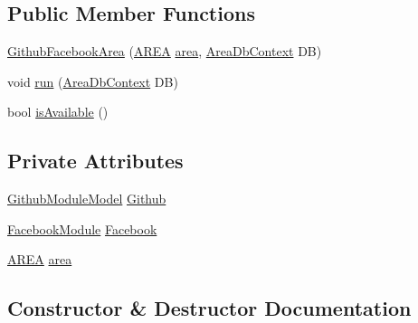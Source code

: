 \subsection*{Public Member Functions}
\begin{DoxyCompactItemize}
\item 
\mbox{\hyperlink{classArea_1_1Models_1_1GithubFacebookArea_a233779b2e51c30dbbfc24051c8bad602}{Github\+Facebook\+Area}} (\mbox{\hyperlink{classArea_1_1Models_1_1AREA}{A\+R\+EA}} \mbox{\hyperlink{classArea_1_1Models_1_1GithubFacebookArea_a4ab3d7c1e18136e3d9b22b640cb3e052}{area}}, \mbox{\hyperlink{classArea_1_1DAT_1_1AreaDbContext}{Area\+Db\+Context}} DB)
\item 
void \mbox{\hyperlink{classArea_1_1Models_1_1GithubFacebookArea_a984d46335dd21d81088312ebe413a0fc}{run}} (\mbox{\hyperlink{classArea_1_1DAT_1_1AreaDbContext}{Area\+Db\+Context}} DB)
\item 
bool \mbox{\hyperlink{classArea_1_1Models_1_1GithubFacebookArea_ab1f22cb94018e33fa92221c812da1020}{is\+Available}} ()
\end{DoxyCompactItemize}
\subsection*{Private Attributes}
\begin{DoxyCompactItemize}
\item 
\mbox{\hyperlink{classArea_1_1Models_1_1GithubModuleModel}{Github\+Module\+Model}} \mbox{\hyperlink{classArea_1_1Models_1_1GithubFacebookArea_a5ff7826b5d7f7578cabc0b0e0ab79646}{Github}}
\item 
\mbox{\hyperlink{classArea_1_1Models_1_1FacebookModule}{Facebook\+Module}} \mbox{\hyperlink{classArea_1_1Models_1_1GithubFacebookArea_af5f388eaff8394ef70a57a38f3e1e065}{Facebook}}
\item 
\mbox{\hyperlink{classArea_1_1Models_1_1AREA}{A\+R\+EA}} \mbox{\hyperlink{classArea_1_1Models_1_1GithubFacebookArea_a4ab3d7c1e18136e3d9b22b640cb3e052}{area}}
\end{DoxyCompactItemize}


\subsection{Constructor \& Destructor Documentation}
\mbox{\label{classArea_1_1Models_1_1GithubFacebookArea_a233779b2e51c30dbbfc24051c8bad602}} 

